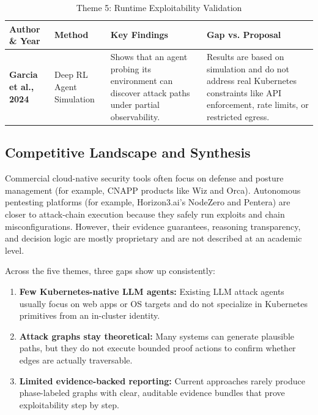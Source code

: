 \documentclass[conference]{IEEEtran}
\begin{document}
\begin{table}[t!]
\centering
\caption{Theme 5: Runtime Exploitability Validation}
\label{tab:litmatrix-theme5}
\scriptsize
\setlength{\tabcolsep}{5pt}
\renewcommand{\arraystretch}{1.3}
\begin{tabularx}{\textwidth}{l p{2.6cm} X X}
\toprule
\textbf{Author \& Year} & \textbf{Method} & \textbf{Key Findings} & \textbf{Gap vs. Proposal} \\
\midrule
\textbf{Garcia et al., 2024} \cite{garcia2024deep} & Deep RL Agent Simulation & Shows that an agent probing its environment can discover attack paths under partial observability. & Results are based on simulation and do not address real Kubernetes constraints like API enforcement, rate limits, or restricted egress. \\
\bottomrule
\end{tabularx}
\end{table}

\subsection{Competitive Landscape and Synthesis}
Commercial cloud-native security tools often focus on defense and posture management (for example, CNAPP products like Wiz and Orca). Autonomous pentesting platforms (for example, Horizon3.ai's NodeZero and Pentera) are closer to attack-chain execution because they safely run exploits and chain misconfigurations. However, their evidence guarantees, reasoning transparency, and decision logic are mostly proprietary and are not described at an academic level.

Across the five themes, three gaps show up consistently:
\begin{enumerate}
    \item \textbf{Few Kubernetes-native LLM agents:} Existing LLM attack agents usually focus on web apps or OS targets and do not specialize in Kubernetes primitives from an in-cluster identity.
    \item \textbf{Attack graphs stay theoretical:} Many systems can generate plausible paths, but they do not execute bounded proof actions to confirm whether edges are actually traversable.
    \item \textbf{Limited evidence-backed reporting:} Current approaches rarely produce phase-labeled graphs with clear, auditable evidence bundles that prove exploitability step by step.
\end{enumerate}
\end{document}
